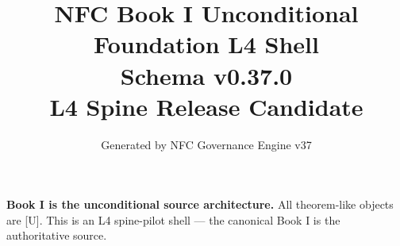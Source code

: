 \documentclass[11pt]{article}
\title{NFC Book I Unconditional Foundation L4 Shell\\[1ex]\large Schema v0.37.0\\[0.5ex]\normalsize L4 Spine Release Candidate}
\author{Generated by NFC Governance Engine v37}
\date{}
\begin{document}
\maketitle
\tableofcontents
\bigskip
\noindent\textbf{Book I is the unconditional source architecture.} All theorem-like objects are [U].
This is an L4 spine-pilot shell --- the canonical Book I is the authoritative source.
\vspace{1em}

\end{document}

